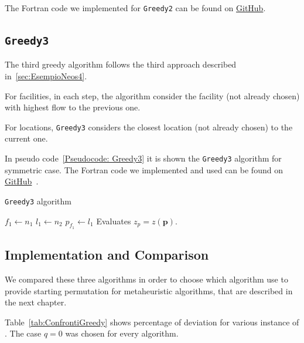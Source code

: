 \noindent The Fortran code we implemented for \texttt{Greedy2} can be found on \href{https://github.com/Tommaso-Mannelli-Mazzoli/QAP/blob/master/Greedy2.f90}{GitHub}.

\subsection{\texttt{Greedy3}}
The third greedy algorithm follows the third approach described in~\ref{sec:EsempioNeos4}.

For facilities, in each step, the algorithm consider the facility (not already chosen) with highest flow to the previous one.

For locations,  \texttt{Greedy3} considers the closest location (not already chosen) to the current one. 


In pseudo code~\ref{Pseudocode: Greedy3} it is shown the \texttt{Greedy3} algorithm for symmetric case. The Fortran code we implemented and used can be found on \href{https://github.com/Tommaso-Mannelli-Mazzoli/QAP/blob/master/Greedy3.f90}{GitHub}~\cite{Mazzoli2020}.

\begin{algorithm}%
	\caption{\texttt{Greedy3} algorithm}
	\label{Pseudocode: Greedy3}

				$f_1 \gets n_1$\; 
				$l_1 \gets n_2$\;
				$p_{f_1}\gets l_1$\;
		Evaluates $z_p = z(\bm p)$.	
\end{algorithm}

\subsection{Implementation and Comparison}
We compared these three algorithms in order to choose which algorithm use to provide starting permutation for metaheuristic algorithms, that are described in the next chapter.



Table~\ref{tab:ConfrontiGreedy} shows percentage of deviation for various instance of \QAP. The case $q=0$ was chosen for every algorithm.  



